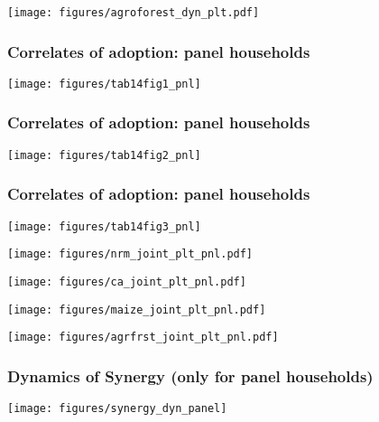 \documentclass[11pt]{beamer}
\begin{document}
\begin{frame}
\label{agroforestdynplt}
\texttt{[image: figures/agroforest\_dyn\_plt.pdf]}
\hyperlink{frstpg}{}
\end{frame}


\begin{frame}
\label{tab14fig1}
\frametitle{Correlates of adoption: panel households}
\texttt{[image: figures/tab14fig1\_pnl]}
\hyperlink{scndpg}{}
\end{frame}


\begin{frame}
\label{tab14fig2}
\frametitle{Correlates of adoption: panel households}
\texttt{[image: figures/tab14fig2\_pnl]}
\hyperlink{scndpg}{}
\end{frame}


\begin{frame}
\label{tab14fig3}
\frametitle{Correlates of adoption: panel households}
\texttt{[image: figures/tab14fig3\_pnl]}
\hyperlink{thrdpg}{}
\end{frame}


\begin{frame}
\label{nrmjointplt}
\texttt{[image: figures/nrm\_joint\_plt\_pnl.pdf]}
\hyperlink{frthpg}{}
\end{frame}

\begin{frame}
\label{cajointplt}
\texttt{[image: figures/ca\_joint\_plt\_pnl.pdf]}
\hyperlink{frthpg}{}
\end{frame}

\begin{frame}
\label{maizejointplt}
\texttt{[image: figures/maize\_joint\_plt\_pnl.pdf]}
\hyperlink{frthpg}{}
\end{frame}


\begin{frame}
\label{agrfrstjointplt}
\texttt{[image: figures/agrfrst\_joint\_plt\_pnl.pdf]}
\hyperlink{frthpg}{}
\end{frame}


\begin{frame}
\label{synergydyn}
\frametitle{Dynamics of Synergy (only for panel households)}
\texttt{[image: figures/synergy\_dyn\_panel]}
\hyperlink{frthpg}{}
\end{frame}
\end{document}
